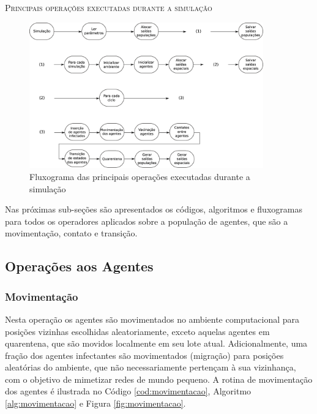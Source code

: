 \newpage

\begin{algorithm}[H]
 \SetAlgoLined
 
 \caption{\textsc{Principais operações executadas durante a simulação}} 
 \label{alg:rotina_principal}
\end{algorithm}

\begin{figure}[H]
  \centering
  \includegraphics[width=0.9\textwidth]{Figuras/EstruturasDadosEstrategias/main.eps}
  \caption{Fluxograma das principais operações executadas durante a simulação}
  \label{fig:rotina_principal}
\end{figure} 

Nas próximas sub-seções são apresentados os códigos, algoritmos e fluxogramas para todos os operadores aplicados sobre a população de agentes, que são a movimentação, contato e transição. 

\newpage

\subsection{Operações aos Agentes}

\subsubsection{Movimentação}

Nesta operação os agentes são movimentados no ambiente computacional para posições vizinhas escolhidas aleatoriamente, exceto aquelas agentes em quarentena, que são movidos localmente em seu lote atual. Adicionalmente, uma fração dos agentes infectantes são movimentados (migração) para posições aleatórias do ambiente, que não necessariamente pertençam à sua vizinhança, com o objetivo de mimetizar redes de mundo pequeno. A rotina de movimentação dos agentes é ilustrada no Código \ref{cod:movimentacao}, Algoritmo \ref{alg:movimentacao} e Figura \ref{fig:movimentacao}.  

